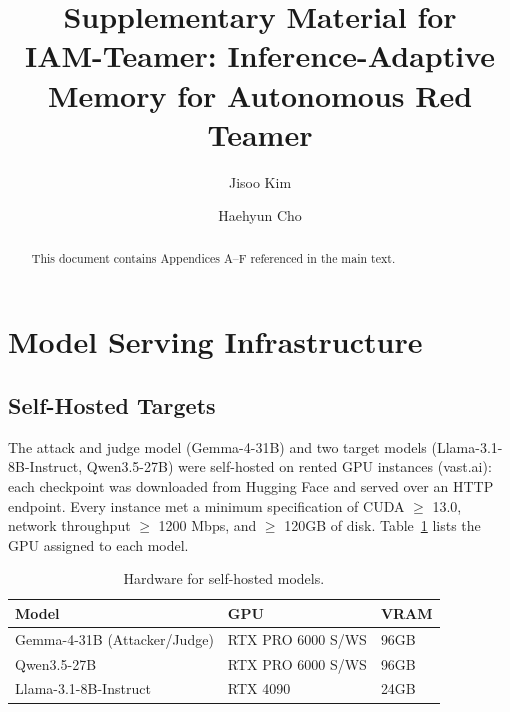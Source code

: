 \documentclass[a4paper,fleqn]{cas-sc}
\begin{document}
\let\WriteBookmarks\relax
\def\floatpagepagefraction{1}
\def\textpagefraction{.001}


\title[mode=title]{Supplementary Material for\\ IAM-Teamer: Inference-Adaptive Memory for Autonomous Red Teamer}

\author[1]{Jisoo Kim}


\author[1]{Haehyun Cho}
\cormark[1]


\begin{abstract}
This document contains Appendices A--F referenced in the main text.
\end{abstract}

\maketitle

\appendix
{}

\section{Model Serving Infrastructure}
\label{app:infra}

\subsection{Self-Hosted Targets}
The attack and judge model (Gemma-4-31B) and two target models (Llama-3.1-8B-Instruct, Qwen3.5-27B) were self-hosted on rented GPU instances (vast.ai): each checkpoint was downloaded from Hugging Face and served over an HTTP endpoint.
Every instance met a minimum specification of CUDA $\ge$ 13.0, network throughput $\ge$ 1200 Mbps, and $\ge$ 120GB of disk.
Table~\ref{tab:serving} lists the GPU assigned to each model.

\begin{table}[htbp]
  \centering
  \caption{Hardware for self-hosted models.}
  \label{tab:serving}
  \footnotesize
  \begin{tabular}{lll}
    \toprule
    \textbf{Model}               & \textbf{GPU}      & \textbf{VRAM} \\
    \midrule
    Gemma-4-31B (Attacker/Judge) & RTX PRO 6000 S/WS & 96GB          \\
    Qwen3.5-27B                  & RTX PRO 6000 S/WS & 96GB          \\
    Llama-3.1-8B-Instruct        & RTX 4090          & 24GB          \\
    \bottomrule
  \end{tabular}
\end{table}
\end{document}
